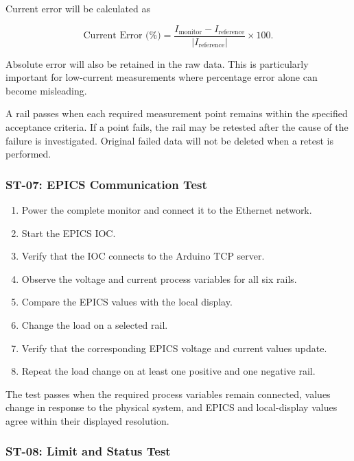Current error will be calculated as

\begin{equation}
    \text{Current Error (\%)} =
    \frac{I_{\text{monitor}}-I_{\text{reference}}}
    {|I_{\text{reference}}|}
    \times 100.
\end{equation}

Absolute error will also be retained in the raw data. This is particularly important
for low-current measurements where percentage error alone can become misleading.

A rail passes when each required measurement point remains within the specified
acceptance criteria. If a point fails, the rail may be retested after the cause of
the failure is investigated. Original failed data will not be deleted when a retest
is performed.

\subsubsection{ST-07: EPICS Communication Test}

\begin{enumerate}
    \item Power the complete monitor and connect it to the Ethernet network.
    \item Start the EPICS IOC.
    \item Verify that the IOC connects to the Arduino TCP server.
    \item Observe the voltage and current process variables for all six rails.
    \item Compare the EPICS values with the local display.
    \item Change the load on a selected rail.
    \item Verify that the corresponding EPICS voltage and current values update.
    \item Repeat the load change on at least one positive and one negative rail.
\end{enumerate}

The test passes when the required process variables remain connected, values change
in response to the physical system, and EPICS and local-display values agree within
their displayed resolution.

\subsubsection{ST-08: Limit and Status Test}

